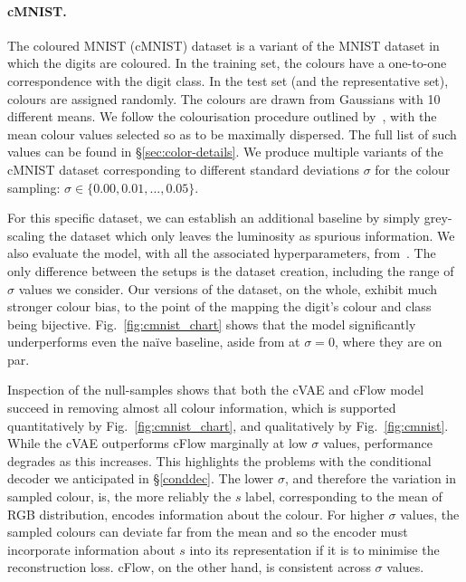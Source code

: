\paragraph{cMNIST.}
%
The coloured MNIST (cMNIST) dataset is a variant of the MNIST dataset in which the digits are
coloured.
%
In the training set, the colours have a one-to-one correspondence with the digit class.
%
In the test set (and the representative set), colours are assigned randomly.
%
The colours are drawn from Gaussians with 10 different means.
%
We follow the colourisation procedure outlined by~\citet{kim2019learning}, with the mean colour
values selected so as to be maximally dispersed.
%
The full list of such values can be found in \S\ref{sec:color-details}.
%
We produce multiple variants of the cMNIST dataset corresponding to different standard deviations
$\sigma$ for the colour sampling: $\sigma \in \{0.00, 0.01, ..., 0.05 \}$.

For this specific dataset, we can establish an additional baseline by simply grey-scaling the
dataset which only leaves the luminosity as spurious information.
%
We also evaluate the model, with all the associated hyperparameters, from~\citet{kim2019learning}.
%
The only difference between the setups is the dataset creation, including the range of $\sigma$
values we consider.
%
Our versions of the dataset, on the whole, exhibit much stronger colour bias, to the point of the
mapping the digit's colour and class being bijective. Fig.~\ref{fig:cmnist_chart} shows that the
model significantly underperforms even the na\"ive baseline, aside from at $\sigma = 0$, where they
are on par.

Inspection of the null-samples shows that both the \ac{cVAE} and \ac{cFlow} model succeed in
removing almost all colour information, which is supported quantitatively by
Fig.~\ref{fig:cmnist_chart}, and qualitatively by Fig.~\ref{fig:cmnist}. 
%
While the \ac{cVAE} outperforms \ac{cFlow} marginally at low $\sigma$ values, performance degrades
as this increases. 
%
This highlights the problems with the conditional decoder we anticipated in \S\ref{conddec}. 
%
The lower $\sigma$, and therefore the variation in sampled colour, is, the more reliably the $s$
label, corresponding to the mean of RGB distribution, encodes information about the colour. 
%
For higher $\sigma$ values, the sampled colours can deviate far from the mean and so the encoder
must incorporate information about $s$ into its representation if it is to minimise the
reconstruction loss. \ac{cFlow}, on the other hand, is consistent across $\sigma$ values.
%
